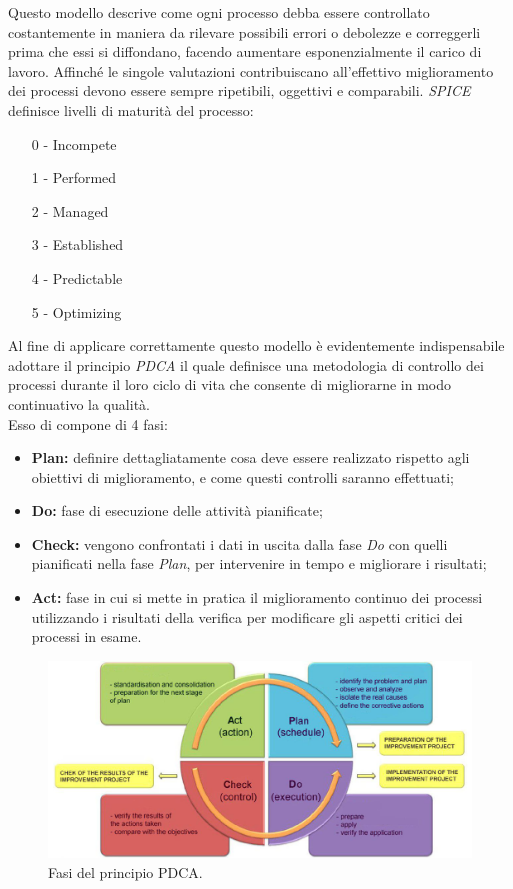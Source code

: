 \documentclass[a4paper]{report}
\begin{document}
				Questo modello descrive come ogni processo debba essere controllato costantemente in maniera da 
				rilevare possibili errori o debolezze e correggerli prima che essi si diffondano, facendo 
				aumentare esponenzialmente il carico di lavoro. Affinché le singole valutazioni contribuiscano 
				all'effettivo miglioramento dei processi devono essere sempre ripetibili, oggettivi e comparabili.
				\emph{SPICE} definisce livelli di maturità del processo:
				\begin{itemize}
					\item[0] - Incompete
					\item[1] - Performed
					\item[2] - Managed
					\item[3] - Established
					\item[4] - Predictable
					\item[5] - Optimizing					
				\end{itemize}
				Al fine di applicare correttamente questo modello è evidentemente indispensabile adottare il 
				principio \emph{PDCA} il quale definisce una metodologia di controllo dei processi durante il loro 
				ciclo di vita che consente di migliorarne in modo continuativo la qualità. \\ 
				Esso di compone di 4 fasi:
				\begin{itemize}
					\item \textbf{Plan:} definire dettagliatamente cosa deve essere realizzato rispetto agli 
					obiettivi di miglioramento, e come questi controlli saranno effettuati;
					\item \textbf{Do:} fase di esecuzione delle attività pianificate;
					\item \textbf{Check:} vengono confrontati i dati in uscita dalla fase \emph{Do} con quelli 
					pianificati nella fase \emph{Plan}, per intervenire in tempo e migliorare i risultati;
					\item \textbf{Act:} fase in cui si mette in pratica il miglioramento continuo dei processi
					 utilizzando i risultati della verifica per modificare gli aspetti critici dei processi in esame.
				\end{itemize}
				\begin{figure}[H]
					\centering
					\includegraphics[scale=0.4]{PDCA.jpg}
					\caption{Fasi del principio PDCA.}
				\end{figure}
\end{document}
